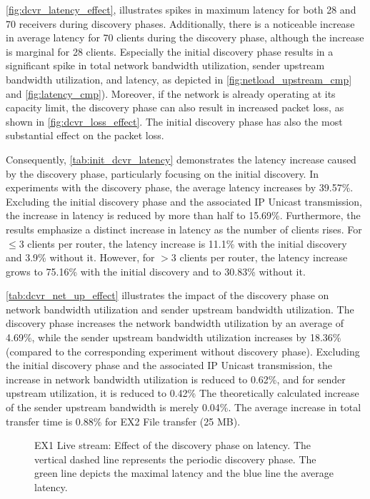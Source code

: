 \autoref{fig:dcvr_latency_effect}, illustrates spikes in maximum latency for
    both 28 and 70 receivers during discovery phases.
Additionally, there is a noticeable increase in average latency for 70 clients
    during the discovery phase, although the increase is marginal for 28
    clients.
Especially the initial discovery phase results in a significant spike in
    total network bandwidth utilization, sender upstream bandwidth utilization,
    and latency, as depicted in \autoref{fig:netload_upstream_cmp} and
    \autoref{fig:latency_cmp}).
Moreover, if the network is already operating at its capacity limit, the
    discovery phase can also result in increased packet loss, as shown in 
    \autoref{fig:dcvr_loss_effect}.
The initial discovery phase has also the most substantial effect on the packet
    loss.

Consequently, \autoref{tab:init_dcvr_latency} demonstrates the latency increase
    caused by the discovery phase, particularly focusing on the initial
    discovery.
In experiments with the discovery phase, the average latency increases by
    39.57\%.
Excluding the initial discovery phase and the associated IP Unicast
    transmission, the increase in latency is reduced by more than half to
    15.69\%.
Furthermore, the results emphasize a distinct increase in latency as the number
    of clients rises.
For $\leq 3$ clients per router, the latency increase is 11.1\% with the
    initial discovery and 3.9\% without it.
However, for $>3$ clients per router, the latency increase grows to 75.16\%
    with the initial discovery and to 30.83\% without it.

\autoref{tab:dcvr_net_up_effect} illustrates the impact of the discovery phase
    on network bandwidth utilization and sender upstream bandwidth utilization.
The discovery phase increases the network bandwidth utilization by an average
    of 4.69\%, while the sender upstream bandwidth utilization increases by
    18.36\% (compared to the corresponding experiment without discovery phase).
Excluding the initial discovery phase and the associated IP Unicast
    transmission, the increase in network bandwidth utilization is reduced to
    0.62\%, and for sender upstream utilization, it is reduced to 0.42\%
The theoretically calculated increase of the sender upstream bandwidth is
    merely 0.04\%.
The average increase in total transfer time is 0.88\% for EX2 File transfer
    (25 MB).

\begin{figure}
    \begin{center}
        
    \end{center}
    \caption[Effect of the discovery phase on latency]{
        EX1 Live stream: Effect of the discovery phase on latency.
        The vertical dashed line represents the periodic discovery phase.
        The green line depicts the maximal latency and the blue line the
        average latency.
    }
    \label{fig:dcvr_latency_effect}
\end{figure}

